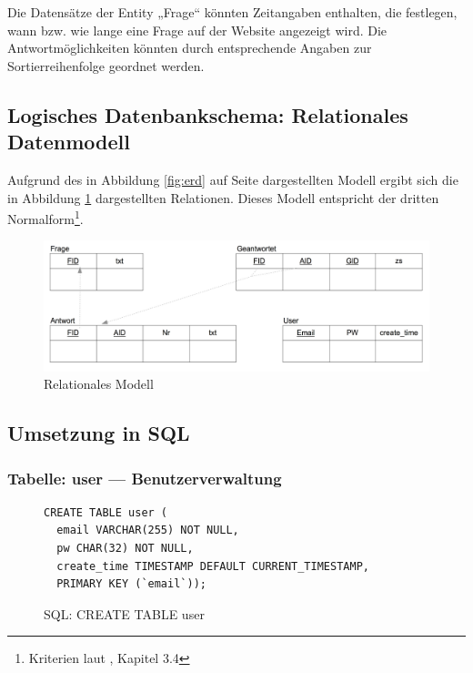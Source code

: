 Die Datensätze der Entity „Frage“ könnten Zeitangaben enthalten, die festlegen, wann bzw. wie lange eine Frage auf der Website angezeigt wird. Die Antwortmöglichkeiten könnten durch entsprechende Angaben zur Sortierreihenfolge geordnet werden.

\subsection{Logisches Datenbankschema: Relationales Datenmodell}

Aufgrund des in Abbildung \ref{fig:erd} auf Seite \pageref{fig:erd} dargestellten Modell ergibt sich die in Abbildung \ref{fig:relmod} dargestellten Relationen. Dieses Modell entspricht der dritten Normalform\footnote{Kriterien laut \cite{dao101}, Kapitel 3.4}.

\begin{figure}[H]
\begin{center}
\includegraphics[width=\textwidth]{relmod.jpg}
\caption{Relationales Modell}
\label{fig:relmod}
\end{center}
\end{figure}

\subsection{Umsetzung in SQL}

\subsubsection{Tabelle: user --- Benutzerverwaltung}
\label{sec:tbluser}
\begin{figure}[H]
\begin{spacing}{1.0}
\begin{verbatim}
CREATE TABLE user (
  email VARCHAR(255) NOT NULL,
  pw CHAR(32) NOT NULL,
  create_time TIMESTAMP DEFAULT CURRENT_TIMESTAMP,
  PRIMARY KEY (`email`));
\end{verbatim}
\caption{SQL: CREATE TABLE user}
\label{sql:tbluser}
\end{spacing}
\end{figure}

